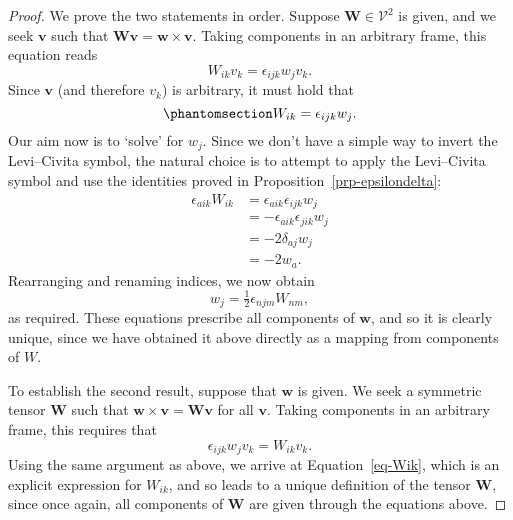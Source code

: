 \documentclass[
  letterpaper,
  DIV=11,
  numbers=noendperiod]{scrreprt}
\theoremstyle{plain}
\theoremstyle{remark}
\begin{document}
\begin{proof}
We prove the two statements in order. Suppose
\({\boldsymbol{W}}\in{\mathcal{V}}^2\) is given, and we seek
\({\boldsymbol{v}}\) such that
\({\boldsymbol{W}}{\boldsymbol{v}}= {\boldsymbol{w}}\times{\boldsymbol{v}}\).
Taking components in an arbitrary frame, this equation reads
\[W_{ik}v_k = \epsilon_{ijk}w_jv_k.\] Since \({\boldsymbol{v}}\) (and
therefore \(v_k\)) is arbitrary, it must hold that
\begin{equation}\phantomsection\label{eq-Wik}{
    W_{ik} = \epsilon_{ijk}w_j.
}\end{equation} Our aim now is to `solve' for \(w_j\). Since we don't
have a simple way to invert the Levi--Civita symbol, the natural choice
is to attempt to apply the Levi--Civita symbol and use the identities
proved in Proposition~\ref{prp-epsilondelta}: \begin{align*}
    \epsilon_{aik}W_{ik} &= \epsilon_{aik}\epsilon_{ijk}w_j\\
                         &= -\epsilon_{aik}\epsilon_{jik}w_j\\
                         &= -2\delta_{aj}w_j\\
                         &= -2w_a.
\end{align*} Rearranging and renaming indices, we now obtain
\[w_j = \tfrac12\epsilon_{njm}W_{nm},\] as required. These equations
prescribe all components of \({\boldsymbol{w}}\), and so it is clearly
unique, since we have obtained it above directly as a mapping from
components of \(W\).

To establish the second result, suppose that \({\boldsymbol{w}}\) is
given. We seek a symmetric tensor \({\boldsymbol{W}}\) such that
\({\boldsymbol{w}}\times{\boldsymbol{v}}={\boldsymbol{W}}{\boldsymbol{v}}\)
for all \({\boldsymbol{v}}\). Taking components in an arbitrary frame,
this requires that \[\epsilon_{ijk}w_jv_k=W_{ik}v_k.\] Using the same
argument as above, we arrive at Equation~\ref{eq-Wik}, which is an
explicit expression for \(W_{ik}\), and so leads to a unique definition
of the tensor \({\boldsymbol{W}}\), since once again, all components of
\({\boldsymbol{W}}\) are given through the equations above.


\end{proof}
\end{document}
